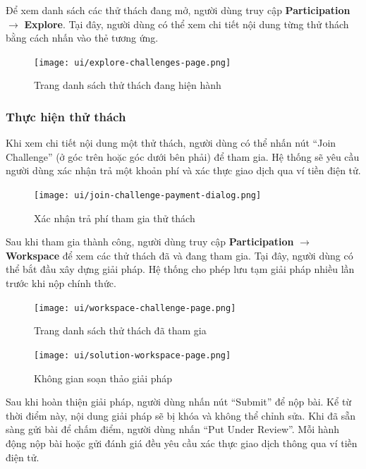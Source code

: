 Để xem danh sách các thử thách đang mở, người dùng truy cập \textbf{Participation} $\rightarrow$ \textbf{Explore}.  
Tại đây, người dùng có thể xem chi tiết nội dung từng thử thách bằng cách nhấn vào thẻ tương ứng.

\begin{figure}[H]
  \centering
  \texttt{[image: ui/explore-challenges-page.png]}
  \caption{Trang danh sách thử thách đang hiện hành}
  \label{fig:explore-challenges-page}
\end{figure}

\subsubsection{Thực hiện thử thách}

Khi xem chi tiết nội dung một thử thách, người dùng có thể nhấn nút ``Join Challenge'' (ở góc trên hoặc góc dưới bên phải) để tham gia.  
Hệ thống sẽ yêu cầu người dùng xác nhận trả một khoản phí và xác thực giao dịch qua ví tiền điện tử.

\begin{figure}[H]
  \centering
  \texttt{[image: ui/join-challenge-payment-dialog.png]}
  \caption{Xác nhận trả phí tham gia thử thách}
  \label{fig:join-challenge-payment-dialog}
\end{figure}

Sau khi tham gia thành công, người dùng truy cập \textbf{Participation} $\rightarrow$ \textbf{Workspace} để xem các thử thách đã và đang tham gia.  
Tại đây, người dùng có thể bắt đầu xây dựng giải pháp. Hệ thống cho phép lưu tạm giải pháp nhiều lần trước khi nộp chính thức.

\begin{figure}[H]
  \centering
  \texttt{[image: ui/workspace-challenge-page.png]}
  \caption{Trang danh sách thử thách đã tham gia}
  \label{fig:workspace-challenge-page}
\end{figure}

\begin{figure}[H]
  \centering
  \texttt{[image: ui/solution-workspace-page.png]}
  \caption{Không gian soạn thảo giải pháp}
  \label{fig:solution-workspace-page}
\end{figure}

Sau khi hoàn thiện giải pháp, người dùng nhấn nút ``Submit'' để nộp bài. Kể từ thời điểm này, nội dung giải pháp sẽ bị khóa và không thể chỉnh sửa.
Khi đã sẵn sàng gửi bài để chấm điểm, người dùng nhấn ``Put Under Review''. Mỗi hành động nộp bài hoặc gửi đánh giá đều yêu cầu xác thực giao dịch thông qua ví tiền điện tử.

